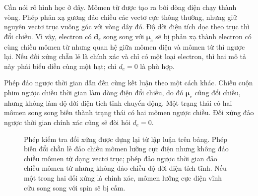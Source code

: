 Cần nói rõ hình học ở đây. Mômen từ được tạo ra bởi dòng điện chạy thành vòng. Phép phản xạ gương đảo chiều các vectơ cực thông thường, nhưng giữ nguyên vectơ trục vuông góc với vòng dây đó. Độ dời điện tích dọc theo trục thì đổi chiều. Vì vậy, electron có \(\mathbf d_e\) song song với \(\boldsymbol\mu_e\) sẽ bị phản xạ thành electron có cùng chiều mômen từ nhưng quan hệ giữa mômen điện và mômen từ thì ngược lại. Nếu đối xứng chẵn lẻ là chính xác và chỉ có một loại electron, thì hai mô tả này phải biểu diễn cùng một hạt; chỉ \(d_e=0\) là phù hợp.

Phép đảo ngược thời gian dẫn đến cùng kết luận theo một cách khác. Chiếu cuộn phim ngược chiều thời gian làm dòng điện đổi chiều, do đó \(\boldsymbol\mu_e\) cũng đổi chiều, nhưng không làm độ dời điện tích tĩnh chuyển động. Một trạng thái có hai mômen song song biến thành trạng thái có hai mômen ngược chiều. Đối xứng đảo ngược thời gian chính xác cũng sẽ đòi hỏi \(d_e=0\).

\begin{figure}[htbp]\centering
{}\caption{Phép kiểm tra đối xứng được dựng lại từ lập luận trên bảng. Phép biến đổi chẵn lẻ đảo chiều mômen lưỡng cực điện nhưng không đảo chiều mômen từ dạng vectơ trục; phép đảo ngược thời gian đảo chiều mômen từ nhưng không đảo chiều độ dời điện tích tĩnh. Nếu một trong hai đối xứng là chính xác, mômen lưỡng cực điện vĩnh cửu song song với spin sẽ bị cấm.}\end{figure}


